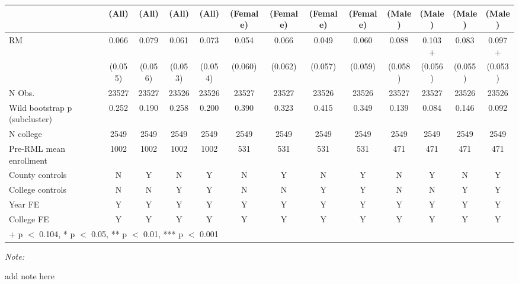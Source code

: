 \begin{table}
\centering
\begin{threeparttable}
\begin{tabular}[t]{lcccccccccccc}
\toprule
  & (All) & (All)  & (All)   & (All)    & (Female) & (Female)  & (Female)   & (Female)    & (Male) & (Male)  & (Male)   & (Male)   \\
\midrule
RM & \num{0.066} & \num{0.079} & \num{0.061} & \num{0.073} & \num{0.054} & \num{0.066} & \num{0.049} & \num{0.060} & \num{0.088} & \num{0.103}+ & \num{0.083} & \num{0.097}+\\
 & (\num{0.055}) & (\num{0.056}) & (\num{0.053}) & (\num{0.054}) & (\num{0.060}) & (\num{0.062}) & (\num{0.057}) & (\num{0.059}) & (\num{0.058}) & (\num{0.056}) & (\num{0.055}) & (\num{0.053})\\
\midrule
N Obs. & \num{23527} & \num{23527} & \num{23526} & \num{23526} & \num{23527} & \num{23527} & \num{23526} & \num{23526} & \num{23527} & \num{23527} & \num{23526} & \num{23526}\\
Wild bootstrap p (subcluster) & 0.252 & 0.190 & 0.258 & 0.200 & 0.390 & 0.323 & 0.415 & 0.349 & 0.139 & 0.084 & 0.146 & 0.092\\
N college & 2549 & 2549 & 2549 & 2549 & 2549 & 2549 & 2549 & 2549 & 2549 & 2549 & 2549 & 2549\\
Pre-RML mean enrollment & 1002 & 1002 & 1002 & 1002 & 531 & 531 & 531 & 531 & 471 & 471 & 471 & 471\\
County controls & N & Y & N & Y & N & Y & N & Y & N & Y & N & Y\\
College controls & N & N & Y & Y & N & N & Y & Y & N & N & Y & Y\\
Year FE & Y & Y & Y & Y & Y & Y & Y & Y & Y & Y & Y & Y\\
College FE & Y & Y & Y & Y & Y & Y & Y & Y & Y & Y & Y & Y\\
\bottomrule
\multicolumn{13}{l}{\rule{0pt}{1em}+ p $<$ 0.104, * p $<$ 0.05, ** p $<$ 0.01, *** p $<$ 0.001}\\
\end{tabular}
\begin{tablenotes}
\item \textit{Note: } 
\item add note here
\end{tablenotes}
\end{threeparttable}
\end{table}
